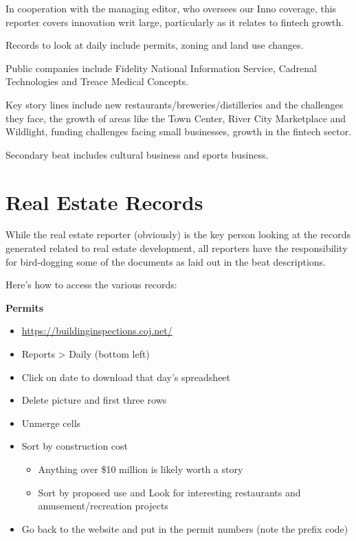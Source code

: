 \documentclass[
  12pt,
  american,
  letterpaperpaper,
  extrafontsizes,onecolumn,openright
  ]{memoir}
\providecommand{\tightlist}{%
  \setlength{\itemsep}{0pt}\setlength{\parskip}{0pt}}
\begin{document}
In cooperation with the managing editor, who oversees our Inno coverage, this reporter covers innovation writ large, particularly as it relates to fintech growth.

Records to look at daily include permits, zoning and land use changes.

Public companies include Fidelity National Information Service, Cadrenal Technologies and Treace Medical Concepts.

Key story lines include new restaurants/breweries/distilleries and the challenges they face, the growth of areas like the Town Center, River City Marketplace and Wildlight, funding challenges facing small businesses, growth in the fintech sector.

Secondary beat includes cultural business and sports business.

\hypertarget{real-estate-records}{%
\chapter{Real Estate Records}\label{real-estate-records}}

While the real estate reporter (obviously) is the key person looking at the records generated related to real estate development, all reporters have the responsibility for bird-dogging some of the documents as laid out in the beat descriptions.

Here's how to access the various records:

\textbf{Permits}

\begin{itemize}
\tightlist
\item
  \url{https://buildinginspections.coj.net/}
\item
  Reports \textgreater{} Daily (bottom left)
\item
  Click on date to download that day's spreadsheet
\item
  Delete picture and first three rows
\item
  Unmerge cells
\item
  Sort by construction cost

  \begin{itemize}
  \tightlist
  \item
    Anything over \$10 million is likely worth a story
  \item
    Sort by proposed use and Look for interesting restaurants and amusement/recreation projects
  \end{itemize}
\item
  Go back to the website and put in the permit numbers (note the prefix code)
\end{itemize}
\end{document}
